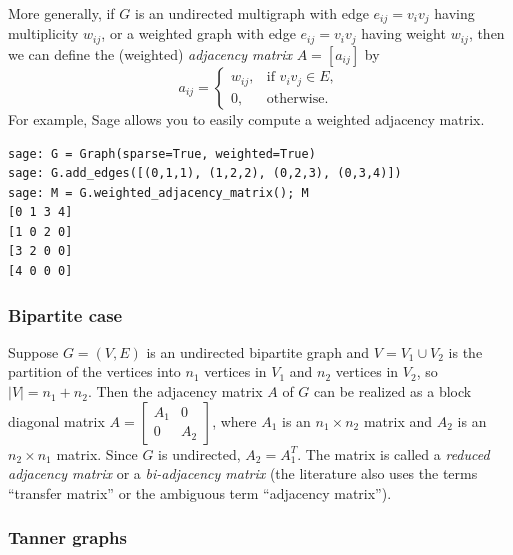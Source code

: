 
More generally, if $G$ is an undirected multigraph with edge
$e_{ij} = v_i v_j$ having multiplicity $w_{ij}$, or a weighted
graph with edge $e_{ij} = v_i v_j$ having weight $w_{ij}$, then we
can define the (weighted) \emph{adjacency matrix} $A = [a_{ij}]$ by
\[
a_{ij}
=
\begin{cases}
w_{ij}, & \text{if $v_i v_j \in E$}, \\
0,      & \text{otherwise}.
\end{cases}
\]
For example, Sage allows you to easily compute a weighted adjacency
matrix.
%
\begin{lstlisting}
sage: G = Graph(sparse=True, weighted=True)
sage: G.add_edges([(0,1,1), (1,2,2), (0,2,3), (0,3,4)])
sage: M = G.weighted_adjacency_matrix(); M
[0 1 3 4]
[1 0 2 0]
[3 2 0 0]
[4 0 0 0]
\end{lstlisting}



\subsubsection{Bipartite case}

Suppose $G = (V, E)$ is an undirected bipartite graph and
$V = V_1 \cup V_2$ is the partition of the vertices into $n_1$
vertices in $V_1$ and $n_2$ vertices in $V_2$, so $|V| = n_1 + n_2$.
Then the adjacency matrix $A$ of $G$ can be realized as a block
diagonal matrix
$A
=
\begin{bmatrix}
A_1 & 0 \\
0 & A_2
\end{bmatrix}$,
where $A_1$ is an $n_1 \times n_2$ matrix and $A_2$ is an
$n_2 \times n_1$ matrix. Since $G$ is undirected, $A_2 = A_1^T$.
The matrix is called a \emph{reduced adjacency matrix} or a
\emph{bi-adjacency matrix} (the literature also uses
the terms ``transfer matrix'' or the ambiguous term
``adjacency matrix'').



\subsubsection{Tanner graphs}

